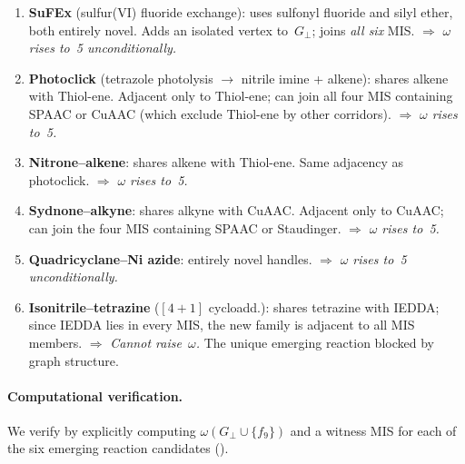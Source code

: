 \documentclass[preprint,12pt]{elsarticle}
\theoremstyle{definition}
\theoremstyle{remark}
\begin{document}
\begin{enumerate}[nosep]
\item \textbf{SuFEx} (sulfur(VI) fluoride exchange):
  uses sulfonyl fluoride and silyl ether, both entirely novel.
  Adds an isolated vertex to~$G_\perp$; joins \emph{all six} MIS.
  $\Rightarrow$ \emph{$\omega$ rises to~5 unconditionally.}

\item \textbf{Photoclick} (tetrazole photolysis $\to$ nitrile
  imine + alkene): shares alkene with Thiol-ene.  Adjacent only
  to Thiol-ene; can join all four MIS containing SPAAC or CuAAC
  (which exclude Thiol-ene by other corridors).
  $\Rightarrow$ \emph{$\omega$ rises to~5.}

\item \textbf{Nitrone--alkene}: shares alkene with Thiol-ene.
  Same adjacency as photoclick.
  $\Rightarrow$ \emph{$\omega$ rises to~5.}

\item \textbf{Sydnone--alkyne}: shares alkyne with CuAAC.
  Adjacent only to CuAAC; can join the four MIS containing
  SPAAC or Staudinger.
  $\Rightarrow$ \emph{$\omega$ rises to~5.}

\item \textbf{Quadricyclane--Ni azide}: entirely novel handles.
  $\Rightarrow$ \emph{$\omega$ rises to~5 unconditionally.}

\item \textbf{Isonitrile--tetrazine} ($[4{+}1]$ cycloadd.):
  shares tetrazine with IEDDA; since IEDDA lies in every
  MIS, the new family is adjacent to all MIS members.
  $\Rightarrow$ \emph{Cannot raise~$\omega$.} The unique
  emerging reaction blocked by graph structure.
\end{enumerate}

\paragraph{Computational verification.}
We verify  by explicitly computing
$\omega(G_\perp \cup \{f_9\})$ and a witness MIS for each of the
six emerging reaction candidates ().
\end{document}

